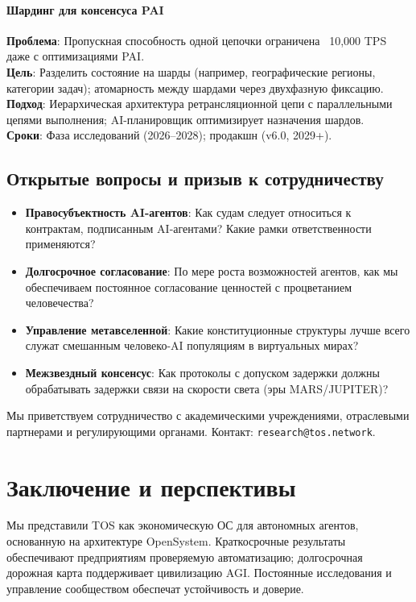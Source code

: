 \documentclass[11pt]{article}
\begin{document}
\paragraph{Шардинг для консенсуса PAI}
\textbf{Проблема}: Пропускная способность одной цепочки ограничена ~10,000 TPS даже с оптимизациями PAI.\\
\textbf{Цель}: Разделить состояние на шарды (например, географические регионы, категории задач); атомарность между шардами через двухфазную фиксацию.\\
\textbf{Подход}: Иерархическая архитектура ретрансляционной цепи с параллельными цепями выполнения; AI-планировщик оптимизирует назначения шардов.\\
\textbf{Сроки}: Фаза исследований (2026--2028); продакшн (v6.0, 2029+).

\subsection{Открытые вопросы и призыв к сотрудничеству}

\begin{itemize}[noitemsep]
  \item \textbf{Правосубъектность AI-агентов}: Как судам следует относиться к контрактам, подписанным AI-агентами? Какие рамки ответственности применяются?
  \item \textbf{Долгосрочное согласование}: По мере роста возможностей агентов, как мы обеспечиваем постоянное согласование ценностей с процветанием человечества?
  \item \textbf{Управление метавселенной}: Какие конституционные структуры лучше всего служат смешанным человеко-AI популяциям в виртуальных мирах?
  \item \textbf{Межзвездный консенсус}: Как протоколы с допуском задержки должны обрабатывать задержки связи на скорости света (эры MARS/JUPITER)?
\end{itemize}

Мы приветствуем сотрудничество с академическими учреждениями, отраслевыми партнерами и регулирующими органами. Контакт: \texttt{research@tos.network}.

\section{Заключение и перспективы}
Мы представили TOS как экономическую ОС для автономных агентов, основанную на архитектуре OpenSystem. Краткосрочные результаты обеспечивают предприятиям проверяемую автоматизацию; долгосрочная дорожная карта поддерживает цивилизацию AGI. Постоянные исследования и управление сообществом обеспечат устойчивость и доверие.
\end{document}
